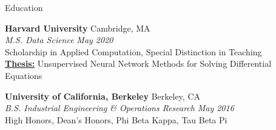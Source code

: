 \documentclass{resume} %
\begin{document}

\begin{rSection}{Education}

{\bf Harvard University} \hfill { Cambridge, MA}
	\\ {\em M.S. Data Science} \hfill {\em May 2020}
	\\ Scholarship in Applied Computation, Special Distinction in Teaching
	\\ {\bf \href{https://dylanrandle.github.io/denn/denn.html}{Thesis:}} Unsupervised Neural Network Methods for Solving Differential Equations

{\bf University of California, Berkeley} \hfill {Berkeley, CA}
	\\ {\em B.S. Industrial Engineering \& Operations Research} \hfill {\em May 2016}
	\\ High Honors, Dean's Honors, Phi Beta Kappa, Tau Beta Pi

\end{rSection}

\end{document}
